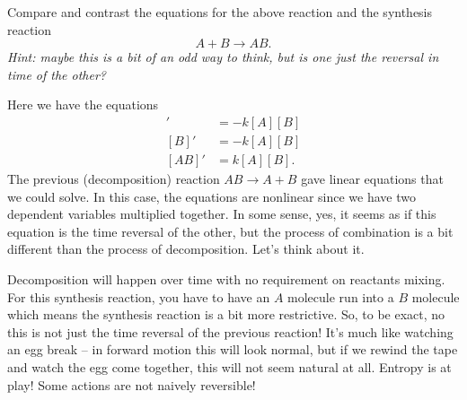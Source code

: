\documentclass[12pt]{article} %
\begin{document}
\newpage

\begin{problem}
    Compare and contrast the equations for the above reaction and the synthesis reaction
    \[
        A+B \to AB.
    \]
    \emph{Hint: maybe this is a bit of an odd way to think, but is one just the reversal in time of the other?}
\end{problem}
\begin{solution}
    Here we have the equations
    \begin{align*}
        [A]' &= -k [A][B]\\
        [B]' &= -k [A][B]\\
        [AB]' &= k [A][B].
    \end{align*}
     The previous (decomposition) reaction $AB\to A+B$ gave linear equations that we could solve.  In this case, the equations are nonlinear since we have two dependent variables multiplied together.  In some sense, yes, it seems as if this equation is the time reversal of the other, but the process of combination is a bit different than the process of decomposition.  Let's think about it.

    Decomposition will happen over time with no requirement on reactants mixing.  For this synthesis reaction, you have to have an $A$ molecule run into a $B$ molecule which means the synthesis reaction is a bit more restrictive. So, to be exact, no this is not just the time reversal of the previous reaction! It's much like watching an egg break -- in forward motion this will look normal, but if we rewind the tape and watch the egg come together, this will not seem natural at all.  Entropy is at play!  Some actions are not naively reversible!
\end{solution}

\newpage
\end{document}
